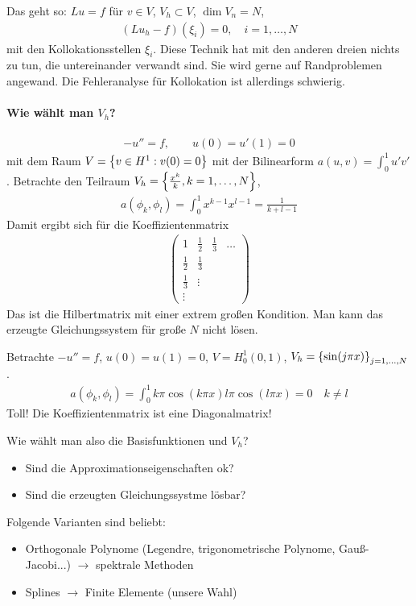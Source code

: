 \begin{beispiel}
\begin{enumerate}
    Das geht so: $Lu = f$ für $v \in V$, $V_h \subset V$, $\dim V_n = N$, 
    \begin{align*}
      (Lu_h - f)(\xi_i) = 0, \quad i = 1, \dots, N
    \end{align*}
    mit den Kollokationsstellen $\xi_i$. Diese Technik hat mit den anderen dreien nichts zu tun, die untereinander verwandt sind. Sie wird gerne auf Randproblemen angewand.
    Die Fehleranalyse für Kollokation ist allerdings schwierig.
  \end{enumerate}  
\end{beispiel}

\paragraph{Wie wählt man $V_h$?}
\begin{beispiel}
  \begin{align*}
    -u''= f, \qquad u(0) = u'(1) = 0
  \end{align*}
mit dem Raum $V = \left\{ v \in H^1: v(0) = 0 \right\}$ mit der Bilinearform $a(u,v) = \int_0^1 u'v'$.
Betrachte den Teilraum $V_h = \left\{ \frac{x^k} k, k = 1, \dots, N \right\}$, 
\begin{align*}
  a(\phi_k, \phi_l) = \int_0^1 x^{k-1}x^{l-1} = \frac 1 {k+ l-1}
\end{align*}
Damit ergibt sich für die Koeffizientenmatrix
\begin{align*}
  \begin{pmatrix}
    1 &\frac{1}{2} &\frac{1}{3} & \dots \\
\frac{1}{2} &\frac{1}{3}\\
\frac{1}{3} & \vdots\\
\vdots 
  \end{pmatrix}
\end{align*}
Das ist die Hilbertmatrix mit einer extrem großen Kondition. Man kann das erzeugte Gleichungssystem für große $N$ nicht lösen.
\end{beispiel}
\begin{beispiel}
 Betrachte $-u'' = f$, $u(0)= u(1) = 0$, $V= H_0^1(0,1)$, $V_h = \left\{ \sin (j \pi x) \right\}_{j = 1, \dots, N}$.
 \begin{align*}
   a(\phi_k, \phi_l)= \int_0^1 k \pi \cos (k \pi x) l \pi \cos(l \pi x) = 0 \quad k \neq l
 \end{align*}
Toll! Die Koeffizientenmatrix ist eine Diagonalmatrix!
\end{beispiel}
Wie wählt man also die Basisfunktionen und $V_h$?
\begin{itemize}
\item Sind die Approximationseigenschaften ok?
\item Sind die erzeugten Gleichungssystme lösbar?
\end{itemize}
Folgende Varianten sind beliebt: 
\begin{itemize}
\item Orthogonale Polynome (Legendre, trigonometrische Polynome, Gauß-Jacobi...) $\to$ spektrale Methoden
\item Splines $\to$ Finite Elemente (unsere Wahl)
\end{itemize}
